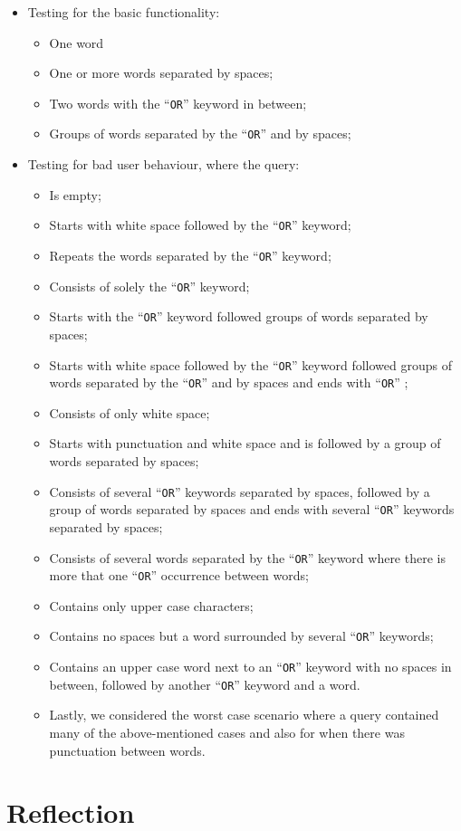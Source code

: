 \begin{itemize}
    \item Testing for the basic functionality:
        \begin{itemize}
            \item One word
            \item One or more words separated by spaces;
            \item Two words with the ``{\tt OR}'' keyword in between;
            \item Groups of words separated by the ``{\tt OR}'' and by spaces;
        \end{itemize}
    \item Testing for bad user behaviour, where the query:
    \begin{itemize}
        \item Is empty;
        \item Starts with white space followed by the ``{\tt OR}'' keyword;
        \item Repeats the words separated by the ``{\tt OR}'' keyword;
        \item Consists of solely the ``{\tt OR}'' keyword;
        \item Starts with the ``{\tt OR}'' keyword followed groups of words separated by spaces;
        \item Starts with white space followed by the ``{\tt OR}'' keyword followed groups of words separated by the ``{\tt OR}'' and by spaces and ends with ``{\tt OR}'' ;
        \item Consists of only white space;
        \item Starts with punctuation and white space and is followed by a group of words separated by spaces;
        \item Consists of several ``{\tt OR}'' keywords separated by spaces, followed by a group of words separated by spaces and ends with several ``{\tt OR}'' keywords separated by spaces;
        \item Consists of several words separated by the ``{\tt OR}'' keyword where there is more that one ``{\tt OR}'' occurrence between words;
        \item Contains only upper case characters;
        \item Contains no spaces but a word surrounded by several ``{\tt OR}'' keywords;
        \item Contains an upper case word next to an ``{\tt OR}'' keyword with no spaces in between, followed by another ``{\tt OR}'' keyword and a word.
        \item Lastly, we considered the worst case scenario where a query contained many of the above-mentioned cases and also for when there was punctuation between words.
    \end{itemize}
\end{itemize}

\section{Reflection} %

